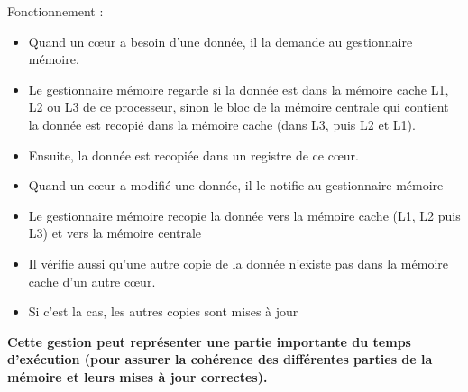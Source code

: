 \documentclass{beamer}
\begin{document}
\begin{frame}
Fonctionnement :

\begin{itemize}
	\item Quand un c\oe ur  a besoin d'une donn\'ee, il la demande au gestionnaire m\'emoire.
	\vfill
	
	\item Le gestionnaire m\'emoire regarde si la donn\'ee est dans la m\'emoire cache L1, L2 ou L3 de ce processeur, sinon le bloc de la m\'emoire centrale qui contient la donn\'ee est recopi\'e dans la m\'emoire cache (dans L3, puis L2 et  L1).
	
	\vfill
	\item Ensuite, la donn\'ee est recopi\'ee dans un registre de ce c\oe ur.
	
	\vfill
\end{itemize}
\end{frame}

\begin{frame}

\vfill
\begin{itemize}
\item Quand un c\oe ur a modifi\'e une donn\'ee, il le notifie au gestionnaire m\'emoire
\vfill
\item Le gestionnaire m\'emoire recopie la donn\'ee vers la m\'emoire cache (L1, L2 puis L3) et vers la m\'emoire centrale
\vfill
\item Il v\'erifie aussi qu'une autre copie de la donn\'ee n'existe pas dans la m\'emoire cache d'un autre c\oe ur.
\vfill
\item Si c'est la cas, les autres copies sont mises \`a jour
\end{itemize}
	\vfill
\end{frame}

\begin{frame}[fragile]
	
	\vfill
{\bf Cette gestion peut repr\'esenter une partie im\-por\-tante du temps d'ex\'ecution (pour assurer la coh\'erence des diff\'erentes parties de la m\'emoire et leurs mises \`a jour correctes).}
	\vfill


\end{frame}
\end{document}
